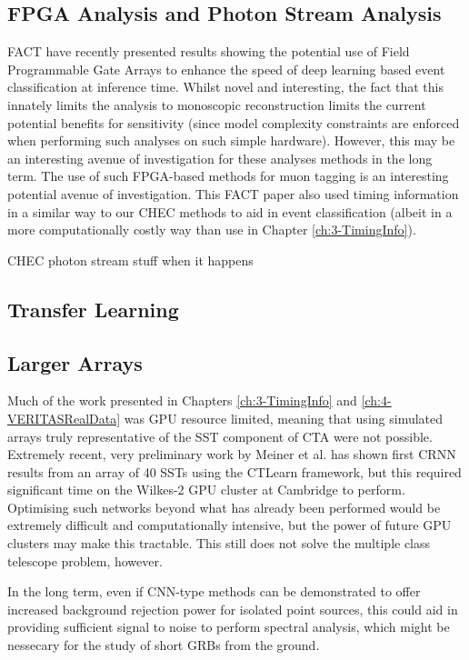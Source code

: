 \subsection{FPGA Analysis and Photon Stream Analysis}

FACT have recently presented results showing the potential use of Field Programmable Gate Arrays to enhance the speed of deep learning based event classification at inference time. Whilst novel and interesting, the fact that this innately limits the analysis to monoscopic reconstruction limits the current potential benefits for sensitivity (since model complexity constraints are enforced when performing such analyses on such simple hardware). However, this may be an interesting avenue of investigation for these analyses methods in the long term. The use of such FPGA-based methods for muon tagging is an interesting potential avenue of investigation. This FACT paper also used timing information in a similar way to our CHEC methods to aid in event classification (albeit in a more computationally costly way than use in Chapter \ref{ch:3-TimingInfo}).

CHEC photon stream stuff when it happens
\subsection{Transfer Learning}

\subsection{Larger Arrays}
Much of the work presented in Chapters \ref{ch:3-TimingInfo} and \ref{ch:4-VERITASRealData} was GPU resource limited, meaning that using simulated arrays truly representative of the SST component of CTA were not possible. Extremely recent, very preliminary work by Meiner et al. has shown first CRNN results from an array of 40 SSTs using the CTLearn framework, but this required significant time on the Wilkes-2 GPU cluster at Cambridge to perform. Optimising such networks beyond what has already been performed would be extremely difficult and computationally intensive, but the power of future GPU clusters may make this tractable. This still does not solve the multiple class telescope problem, however.

In the long term, even if CNN-type methods can be demonstrated to offer increased background rejection power for isolated point sources, this could aid in providing sufficient signal to noise to perform spectral analysis, which might be nessecary for the study of short GRBs from the ground.